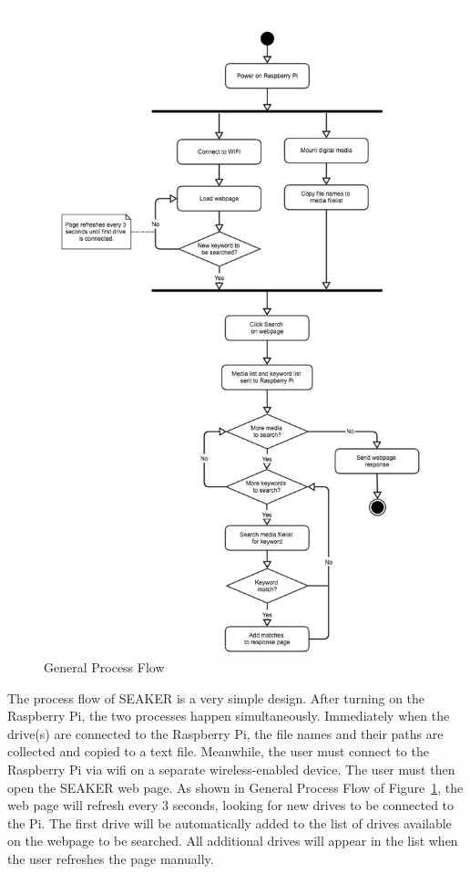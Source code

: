 \documentclass[12pt]{article}
\begin{document}
\begin{figure}[H]
  \begin{center}
  \includegraphics[width=11cm]{images/ProcessFlow.png}
  \caption{General Process Flow}
  \label{fig:ProcessFlow}
  \end{center}
\end{figure}

The process flow of SEAKER is a very simple design. After turning on
the Raspberry Pi, the two processes happen simultaneously. Immediately
when the drive(s) are connected to the Raspberry Pi, the file names
and their paths are collected and copied to a text file. Meanwhile,
the user must connect to the Raspberry Pi via \gls{wifi} on a separate
wireless-enabled device. The user must then open the SEAKER web page.
As shown in General Process Flow of Figure~\ref{fig:ProcessFlow},
the web page will refresh every 3 seconds, looking for new drives to
be connected to the Pi. The first drive will be automatically added
to the list of drives available on the webpage to be searched. All
additional drives will appear in the list when the user refreshes
the page manually.\\
\end{document}
